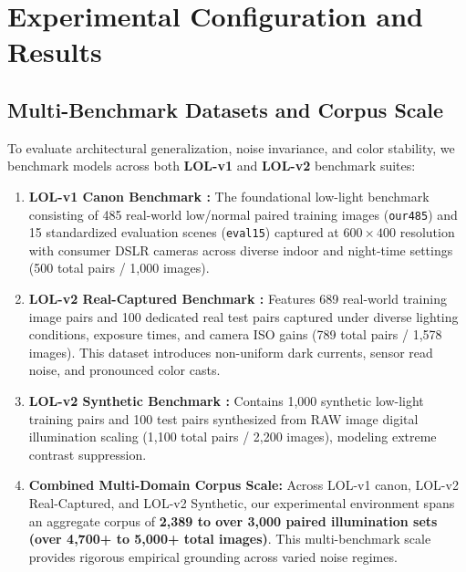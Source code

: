 \documentclass[10pt,twocolumn,letterpaper]{article}
\begin{document}
\section{Experimental Configuration and Results}

\subsection{Multi-Benchmark Datasets and Corpus Scale}
To evaluate architectural generalization, noise invariance, and color stability, we benchmark models across both \textbf{LOL-v1} and \textbf{LOL-v2} benchmark suites:
\begin{enumerate}
    \item \textbf{LOL-v1 Canon Benchmark \cite{wei2018deep}:} The foundational low-light benchmark consisting of 485 real-world low/normal paired training images (\texttt{our485}) and 15 standardized evaluation scenes (\texttt{eval15}) captured at $600 \times 400$ resolution with consumer DSLR cameras across diverse indoor and night-time settings (500 total pairs / 1,000 images).
    \item \textbf{LOL-v2 Real-Captured Benchmark \cite{yang2021sparse}:} Features 689 real-world training image pairs and 100 dedicated real test pairs captured under diverse lighting conditions, exposure times, and camera ISO gains (789 total pairs / 1,578 images). This dataset introduces non-uniform dark currents, sensor read noise, and pronounced color casts.
    \item \textbf{LOL-v2 Synthetic Benchmark \cite{yang2021sparse}:} Contains 1,000 synthetic low-light training pairs and 100 test pairs synthesized from RAW image digital illumination scaling (1,100 total pairs / 2,200 images), modeling extreme contrast suppression.
    \item \textbf{Combined Multi-Domain Corpus Scale:} Across LOL-v1 canon, LOL-v2 Real-Captured, and LOL-v2 Synthetic, our experimental environment spans an aggregate corpus of \textbf{2,389 to over 3,000 paired illumination sets (over 4,700+ to 5,000+ total images)}. This multi-benchmark scale provides rigorous empirical grounding across varied noise regimes.
\end{enumerate}
\end{document}
